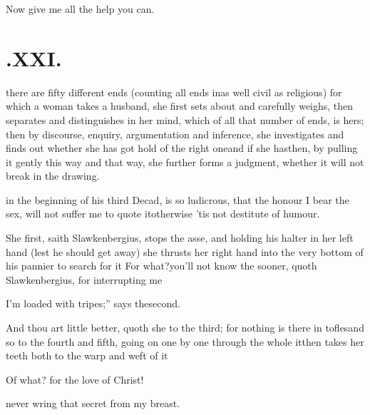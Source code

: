 \documentclass{article}
\begin{document}
Now give me all the help you can.

\vfill{}\eject
\null{}\baselineskip
\section{.\enspace XXI.}

 there are fifty different ends\break
(counting all ends in\tsh as well civil as religious) for
which a woman takes a husband, she first sets about and
\break carefully
weighs, then separates and distinguishes in her mind, which of all
that number of ends, is hers; then by discourse, enquiry,
argumentation and inference, she investigates and finds out
whether she has got hold of the right one\tsh and if
she has\tsh then, by pulling it gently this way and that
way, she further forms a judgment, whether it will not break in the
drawing.

\noindent
{}
\etp{}
in the beginning of his third Decad, is so ludicrous, that the honour I bear
the sex, will not suffer me to quote it\tsh\break otherwise ’tis not destitute of
humour.

\lqq She first, saith Slawkenbergius, stops the asse, and holding his halter in her left
hand (lest he should get away) she thrusts her right hand into the very\break
bottom of his pannier to search for it\tsk\break
For what?\tsk you’ll not know the sooner, quoth
Slawkenbergius, for interrupting me\tsh

\noindent\etp
{}

\lqq I’m loaded with tripes;” says the\break second.

\tsh And thou art little better, quoth she to the third; for nothing is there in
tofles\tsk and so to the fourth and fifth, going on
one by one through the whole 
it\tsk then takes her teeth both to the warp and weft
of it\tsh

\tsh Of what? for the love of Christ!

\noindent
{}
never wring that secret from my breast.
\end{document}
